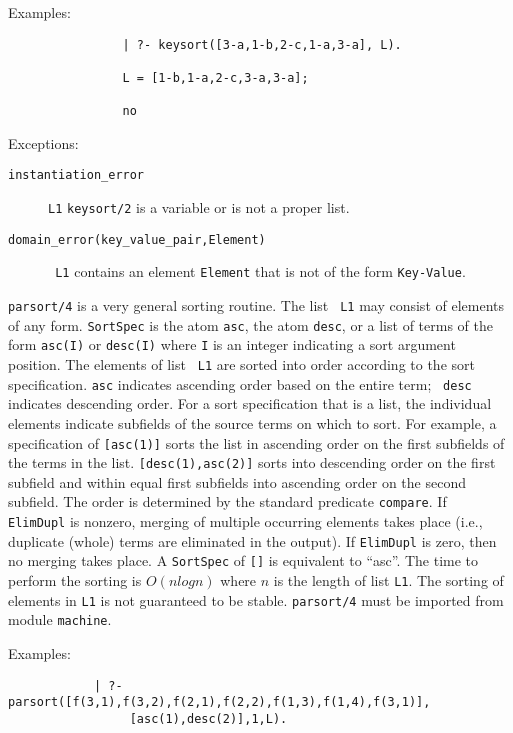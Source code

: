 \begin{description}
    Examples:
    {\footnotesize
     \begin{verbatim}
                | ?- keysort([3-a,1-b,2-c,1-a,3-a], L).

                L = [1-b,1-a,2-c,3-a,3-a];

                no \end{verbatim}}
     Exceptions: 
\begin{description} 
\item[{\tt instantiation\_error}]
     {\tt L1} {\tt keysort/2} is a variable or is not a proper
     list.  
\item[{\tt domain\_error(key\_value\_pair,Element)}] {\tt
     L1} contains an element {\tt Element} that is not of the
     form \verb'Key-Value'.  
\end{description}


    {\tt parsort/4} is a very general sorting routine.  The list {\tt
    L1} may consist of elements of any form.  {\tt SortSpec} is the
    atom {\tt asc}, the atom {\tt desc}, or a list of terms of the
    form {\tt asc(I)} or {\tt desc(I)} where {\tt I} is an integer
    indicating a sort argument position.  The elements of list {\tt
    L1} are sorted into order according to the sort specification.
    {\tt asc} indicates ascending order based on the entire term; {\tt
    desc} indicates descending order.  For a sort specification that
    is a list, the individual elements indicate subfields of the
    source terms on which to sort.  For example, a specification of
    {\tt [asc(1)]} sorts the list in ascending order on the first
    subfields of the terms in the list.  {\tt [desc(1),asc(2)]} sorts
    into descending order on the first subfield and within equal first
    subfields into ascending order on the second subfield.  The order
    is determined by the standard predicate {\tt compare}.  If {\tt
    ElimDupl} is nonzero, merging of multiple occurring elements takes
    place (i.e., duplicate (whole) terms are eliminated in the
    output).  If {\tt ElimDupl} is zero, then no merging takes place.
    A {\tt SortSpec} of {\tt []} is equivalent to ``asc''.  The time
    to perform the sorting is $O(n log n)$ where $n$ is the length of
    list {\tt L1}.  The sorting of elements in {\tt L1} is not
    guaranteed to be stable. {\tt parsort/4} must be imported from
    module {\tt machine}.

    Examples:
    {\footnotesize
     \begin{verbatim}
            | ?- parsort([f(3,1),f(3,2),f(2,1),f(2,2),f(1,3),f(1,4),f(3,1)],
                 [asc(1),desc(2)],1,L). 


\end{verbatim}}
\end{description}
